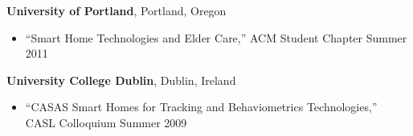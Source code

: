 {\bf University of Portland}, Portland, Oregon
\begin{itemize}
	\item ``Smart Home Technologies and Elder Care,'' ACM Student Chapter \hfill Summer 2011
\end{itemize}

{\bf University College Dublin}, Dublin, Ireland
\begin{itemize}
	\item ``CASAS Smart Homes for Tracking and Behaviometrics Technologies,'' \\
	\indent CASL Colloquium \hfill Summer 2009
\end{itemize}

